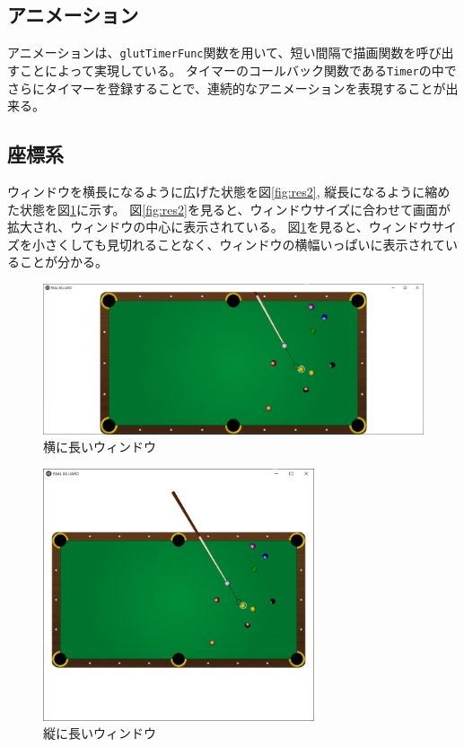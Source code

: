 \documentclass[a4j,titlepage]{jsarticle}
\begin{document}
\subsection{アニメーション}
アニメーションは、\texttt{glutTimerFunc}関数を用いて、短い間隔で描画関数を呼び出すことによって実現している。
タイマーのコールバック関数である\texttt{Timer}の中でさらにタイマーを登録することで、連続的なアニメーションを表現することが出来る。

\subsection{座標系}
ウィンドウを横長になるように広げた状態を図\ref{fig:res2}, 縦長になるように縮めた状態を図\ref{fig:res3}に示す。
図\ref{fig:res2}を見ると、ウィンドウサイズに合わせて画面が拡大され、ウィンドウの中心に表示されている。
図\ref{fig:res3}を見ると、ウィンドウサイズを小さくしても見切れることなく、ウィンドウの横幅いっぱいに表示されていることが分かる。

\begin{figure}[H]
  \centering
  \includegraphics[width=12cm]{result3.png}
  \caption{横に長いウィンドウ}
  \label{fig:res3}
\end{figure}

\begin{figure}[H]
  \centering
  \includegraphics[width=8cm]{result4.png}
  \caption{縦に長いウィンドウ}
  \label{fig:res4}
\end{figure}
\end{document}
